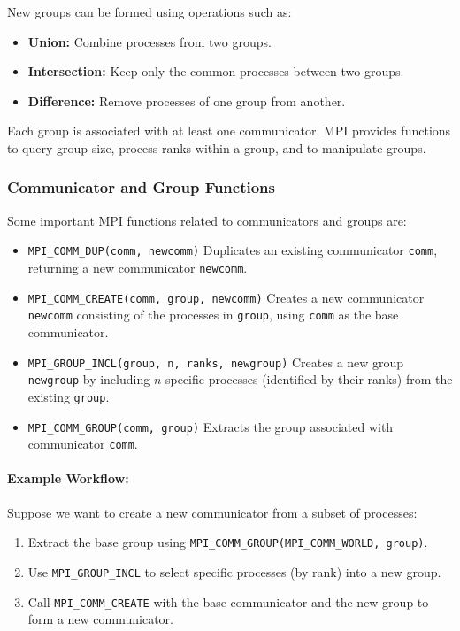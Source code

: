 \documentclass[12pt]{book}
\begin{document}
New groups can be formed using operations such as:
\begin{itemize}
    \item \textbf{Union:} Combine processes from two groups.
    \item \textbf{Intersection:} Keep only the common processes between two groups.
    \item \textbf{Difference:} Remove processes of one group from another.
\end{itemize}

Each group is associated with at least one communicator. MPI provides functions to query group size, process ranks within a group, and to manipulate groups.

\subsubsection{Communicator and Group Functions}
Some important MPI functions related to communicators and groups are:
\begin{itemize}
    \item \texttt{MPI\_COMM\_DUP(comm, newcomm)}  
    Duplicates an existing communicator \texttt{comm}, returning a new communicator \texttt{newcomm}.
    
    \item \texttt{MPI\_COMM\_CREATE(comm, group, newcomm)}  
    Creates a new communicator \texttt{newcomm} consisting of the processes in \texttt{group}, using \texttt{comm} as the base communicator.
    
    \item \texttt{MPI\_GROUP\_INCL(group, n, ranks, newgroup)}  
    Creates a new group \texttt{newgroup} by including $n$ specific processes (identified by their ranks) from the existing \texttt{group}.
    
    \item \texttt{MPI\_COMM\_GROUP(comm, group)}  
    Extracts the group associated with communicator \texttt{comm}.
\end{itemize}

\paragraph{Example Workflow:}  
Suppose we want to create a new communicator from a subset of processes:
\begin{enumerate}
    \item Extract the base group using \texttt{MPI\_COMM\_GROUP(MPI\_COMM\_WORLD, group)}.
    \item Use \texttt{MPI\_GROUP\_INCL} to select specific processes (by rank) into a new group.
    \item Call \texttt{MPI\_COMM\_CREATE} with the base communicator and the new group to form a new communicator.
\end{enumerate}
\end{document}
